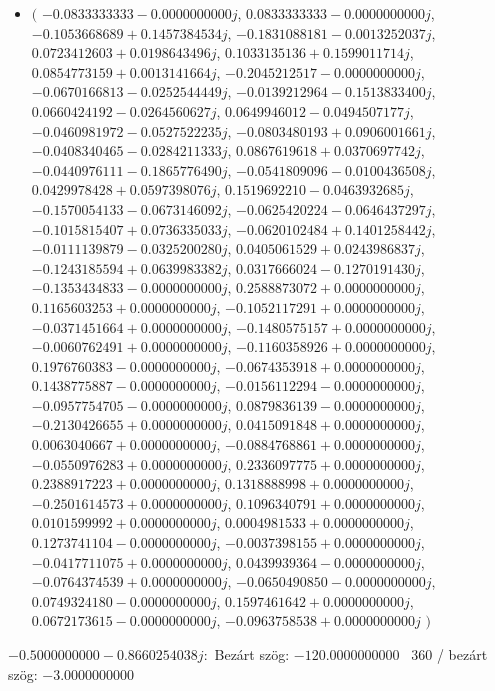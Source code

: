 \documentclass[14pt,a4paper]{article}
\begin{document}
\begin{itemize}
\item
$\big($
$-0.0833333333-0.0000000000j$, $0.0833333333-0.0000000000j$, $-0.1053668689+0.1457384534j$, $-0.1831088181-0.0013252037j$, $0.0723412603+0.0198643496j$, $0.1033135136+0.1599011714j$, $0.0854773159+0.0013141664j$, $-0.2045212517-0.0000000000j$, $-0.0670166813-0.0252544449j$, $-0.0139212964-0.1513833400j$, $0.0660424192-0.0264560627j$, $0.0649946012-0.0494507177j$, $-0.0460981972-0.0527522235j$, $-0.0803480193+0.0906001661j$, $-0.0408340465-0.0284211333j$, $0.0867619618+0.0370697742j$, $-0.0440976111-0.1865776490j$, $-0.0541809096-0.0100436508j$, $0.0429978428+0.0597398076j$, $0.1519692210-0.0463932685j$, $-0.1570054133-0.0673146092j$, $-0.0625420224-0.0646437297j$, $-0.1015815407+0.0736335033j$, $-0.0620102484+0.1401258442j$, $-0.0111139879-0.0325200280j$, $0.0405061529+0.0243986837j$, $-0.1243185594+0.0639983382j$, $0.0317666024-0.1270191430j$, $-0.1353434833-0.0000000000j$, $0.2588873072+0.0000000000j$, $0.1165603253+0.0000000000j$, $-0.1052117291+0.0000000000j$, $-0.0371451664+0.0000000000j$, $-0.1480575157+0.0000000000j$, $-0.0060762491+0.0000000000j$, $-0.1160358926+0.0000000000j$, $0.1976760383-0.0000000000j$, $-0.0674353918+0.0000000000j$, $0.1438775887-0.0000000000j$, $-0.0156112294-0.0000000000j$, $-0.0957754705-0.0000000000j$, $0.0879836139-0.0000000000j$, $-0.2130426655+0.0000000000j$, $0.0415091848+0.0000000000j$, $0.0063040667+0.0000000000j$, $-0.0884768861+0.0000000000j$, $-0.0550976283+0.0000000000j$, $0.2336097775+0.0000000000j$, $0.2388917223+0.0000000000j$, $0.1318888998+0.0000000000j$, $-0.2501614573+0.0000000000j$, $0.1096340791+0.0000000000j$, $0.0101599992+0.0000000000j$, $0.0004981533+0.0000000000j$, $0.1273741104-0.0000000000j$, $-0.0037398155+0.0000000000j$, $-0.0417711075+0.0000000000j$, $0.0439939364-0.0000000000j$, $-0.0764374539+0.0000000000j$, $-0.0650490850-0.0000000000j$, $0.0749324180-0.0000000000j$, $0.1597461642+0.0000000000j$, $0.0672173615-0.0000000000j$, $-0.0963758538+0.0000000000j$
$\big)$
\end{itemize}
$-0.5000000000-0.8660254038j$:\
Bezárt szög: $-120.0000000000$ \
360 / bezárt szög: $-3.0000000000$\
\end{document}
